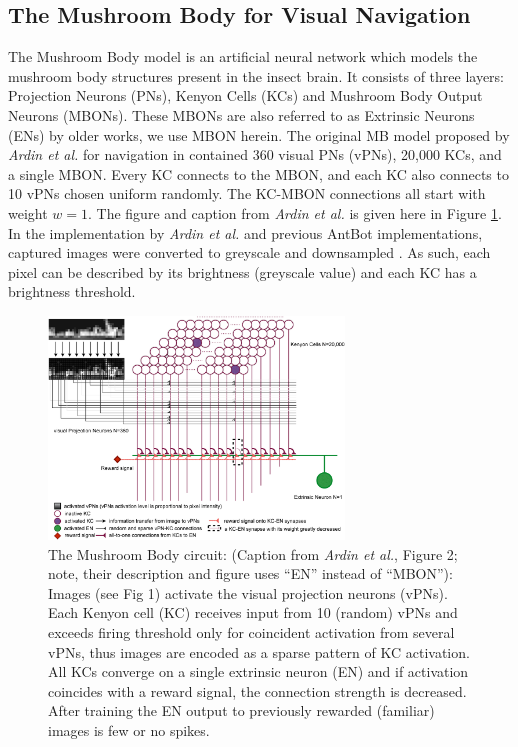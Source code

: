 \documentclass[a4paper,11pt,twoside,openright]{article}
\begin{document}

\subsection{ The Mushroom Body for Visual Navigation } \label{MBBackground}
The Mushroom Body model is an artificial neural network which models
the mushroom body structures present in the insect brain\cite{Ardin2016}. It
consists of three layers: Projection Neurons (PNs), Kenyon Cells (KCs) and
Mushroom Body Output Neurons (MBONs). These MBONs are also referred to as
Extrinsic Neurons (ENs) by older works, we use MBON herein. The original MB model
proposed by \textit{Ardin et al.} for navigation in \cite{Ardin2016} contained
360 visual PNs (vPNs), 20,000 KCs, and a single MBON. Every KC connects to the
MBON, and each KC also connects to 10 vPNs chosen uniform randomly. The KC-MBON
connections all start with weight $w=1$. The figure and caption from
\textit{Ardin et al.} is given here in Figure \ref{fig:mb}. In the implementation
by \textit{Ardin et al.} and previous AntBot implementations, captured images
were converted to greyscale and downsampled \cite{Ardin2016, Eberding2016,
  Zhang2017, Mitchell2018}. As such, each pixel can be described by its
brightness (greyscale value) and each KC has a brightness threshold.
\newline
\par

\begin{figure}
  \centering
  \includegraphics[width=0.7\textwidth]{Ardin2010MBModel}
  \caption{\label{fig:mb} The Mushroom Body circuit: (Caption from
    \textit{Ardin et al.}, Figure 2; note, their description and figure uses
    ``EN'' instead of ``MBON''): Images (see Fig 1) activate the visual
    projection neurons (vPNs). Each Kenyon cell (KC) receives input from 10
    (random) vPNs and exceeds firing threshold only for coincident activation
    from several vPNs, thus images are encoded as a sparse pattern of KC
    activation. All KCs converge on a single extrinsic neuron (EN) and if
    activation coincides with a reward signal, the connection strength is
    decreased. After training the EN output to previously rewarded (familiar)
    images is few or no spikes.}
\end{figure}
\end{document}
